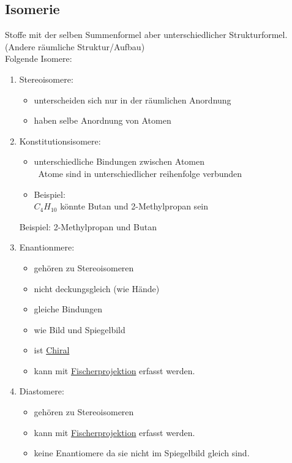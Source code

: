 \subsection{Isomerie}
\label{sec:isomere}
Stoffe mit der selben Summenformel aber unterschiedlicher Strukturformel. \\
(Andere räumliche Struktur/Aufbau) \\
Folgende Isomere: 
\begin{enumerate}
    \item Stereoisomere:
        \begin{itemize}
            \item unterscheiden sich nur in der räumlichen Anordnung
            \item haben selbe Anordnung von Atomen
        \end{itemize}
    \item Konstitutionsisomere:
        \begin{itemize}
            \item unterschiedliche Bindungen zwischen Atomen \\
                \textrightarrow\ Atome sind in unterschiedlicher reihenfolge verbunden
            \item Beispiel: \\
                $C_4H_10$ könnte Butan und 2-Methylpropan sein
        \end{itemize}
        Beispiel: 2-Methylpropan und Butan
    \item Enantionmere:
        \begin{multicols}{2}
            \begin{itemize}
                \item gehören zu Stereoisomeren
                \item nicht deckungsgleich (wie Hände)
                \item gleiche Bindungen
                \item wie Bild und Spiegelbild
                \item ist \hyperref[sec:chiral]{Chiral}
                \item kann mit \hyperref[sec:fischer]{Fischerprojektion} erfasst werden.
            \end{itemize}
        \end{multicols}
    \item Diastomere:
        \begin{itemize}
            \item gehören zu Stereoisomeren
            \item kann mit \hyperref[sec:fischer]{Fischerprojektion} erfasst werden.
            \item keine Enantiomere da sie nicht im Spiegelbild gleich sind.
        \end{itemize}
\end{enumerate}

